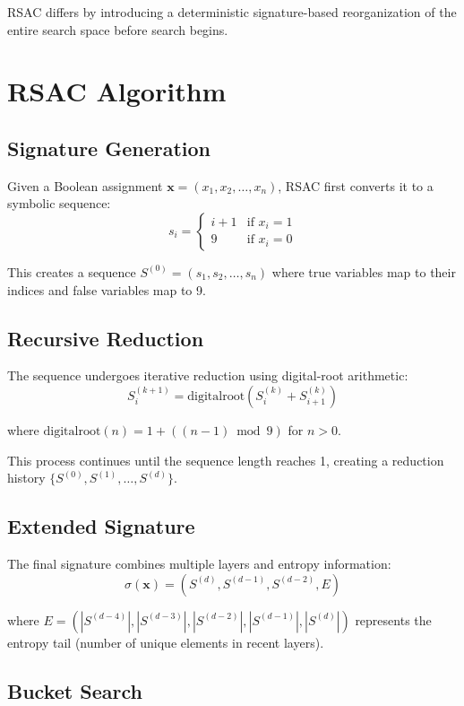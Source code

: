 \documentclass[conference]{IEEEtran}
\begin{document}
RSAC differs by introducing a deterministic signature-based reorganization of the entire search space before search begins.

\section{RSAC Algorithm}

\subsection{Signature Generation}

Given a Boolean assignment $\mathbf{x} = (x_1, x_2, \ldots, x_n)$, RSAC first converts it to a symbolic sequence:
$$s_i = \begin{cases} 
i+1 & \text{if } x_i = 1 \\
9 & \text{if } x_i = 0
\end{cases}$$

This creates a sequence $S^{(0)} = (s_1, s_2, \ldots, s_n)$ where true variables map to their indices and false variables map to 9.

\subsection{Recursive Reduction}

The sequence undergoes iterative reduction using digital-root arithmetic:
$$S^{(k+1)}_i = \text{digitalroot}(S^{(k)}_i + S^{(k)}_{i+1})$$

where $\text{digitalroot}(n) = 1 + ((n-1) \bmod 9)$ for $n > 0$.

This process continues until the sequence length reaches 1, creating a reduction history $\{S^{(0)}, S^{(1)}, \ldots, S^{(d)}\}$.

\subsection{Extended Signature}

The final signature combines multiple layers and entropy information:
$$\sigma(\mathbf{x}) = (S^{(d)}, S^{(d-1)}, S^{(d-2)}, E)$$

where $E = (|S^{(d-4)}|, |S^{(d-3)}|, |S^{(d-2)}|, |S^{(d-1)}|, |S^{(d)}|)$ represents the entropy tail (number of unique elements in recent layers).

\subsection{Bucket Search}
\end{document}
